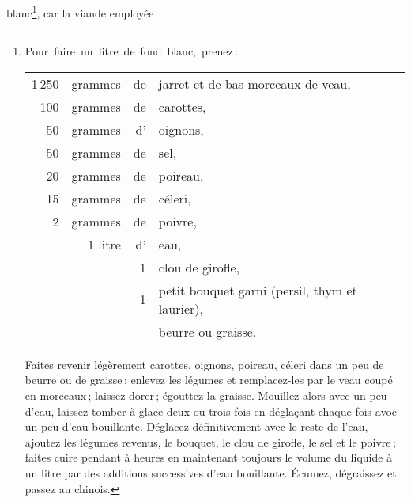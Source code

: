 blanc\footnote{ 
Pour faire un litre de fond blanc, prenez :
\protect
\begin{tabular}{rrrp{16em}}
\hspace{4em} 1 250 & grammes & de & jarret et de bas morceaux de veau,                                    \\
\hspace{4em}   100 & grammes & de & carottes,                                                             \\
\hspace{4em}    50 & grammes & d' & oignons,                                                              \\
\hspace{4em}    50 & grammes & de & sel,                                                                  \\
\hspace{4em}    20 & grammes & de & poireau,                                                              \\
\hspace{4em}    15 & grammes & de & céleri,                                                               \\
\hspace{4em}     2 & grammes & de & poivre,                                                               \\
\hspace{4em}       & 1 litre & d' & eau,                                                                  \\
\hspace{4em}       &         &  1 & clou de girofle,                                                      \\
\hspace{4em}       &         &  1 & petit bouquet garni (persil, thym et laurier),                        \\
\hspace{4em}       &         &    & beurre ou graisse.                                                    \\
\end{tabular}
\smallskip
\protect\endgraf
Faites revenir légèrement carottes, oignons, poireau, céleri dans un peu de
beurre ou de graisse ; enlevez les légumes et remplacez-les par le veau coupé
en morceaux ; laissez dorer ; égouttez la graisse. Mouillez alors avec un peu
d'eau, laissez tomber à glace deux ou trois fois en déglaçant chaque fois avoc
un peu d'eau bouillante. Déglacez définitivement avec le reste de l'eau,
ajoutez les légumes revenus, le bouquet, le clou de girofle, le sel et le
poivre ; faites cuire pendant {\mmm} à {\mmm} heures en maintenant
toujours le volume du liquide à un litre par des additions successives d'eau
bouillante. Écumez, dégraissez et passez au chinois.}, car la viande employée
